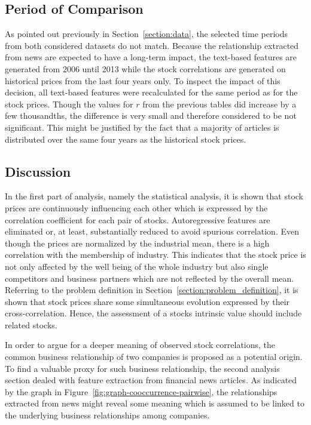 \subsection{Period of Comparison}
As pointed out previously in Section~\ref{section:data}, the selected time periods from both considered datasets do not match. Because the relationship extracted from news are expected to have a long-term impact, the text-based features are generated from 2006 until 2013 while the stock correlations are generated on historical prices from the last four years only. To inspect the impact of this decision, all text-based features were recalculated for the same period as for the stock prices. Though the values for $r$ from the previous tables did increase by a few thousandths, the difference is very small and therefore considered to be not significant. This might be justified by the fact that a majority of articles is distributed over the same four years as the historical stock prices.

\subsection{Discussion}

In the first part of analysis, namely the statistical analysis, it is shown that stock prices are continuously influencing each other which is expressed by the correlation coefficient for each pair of stocks. Autoregressive features are eliminated or, at least, substantially reduced to avoid spurious correlation. Even though the prices are normalized by the industrial mean, there is a high correlation with the membership of industry. This indicates that the stock price is not only affected by the well being of the whole industry but also single competitors and business partners which are not reflected by the overall mean. Referring to the problem definition in Section~\ref{section:problem_definition}, it is shown that stock prices share some simultaneous evolution expressed by their cross-correlation. Hence, the assessment of a stocks intrinsic value should include related stocks.

In order to argue for a deeper meaning of observed stock correlations, the common business relationship of two companies is proposed as a potential origin. To find a valuable proxy for such business relationship, the second analysis section dealed with feature extraction from financial news articles. As indicated by the graph in Figure~\ref{fig:graph-cooccurrence-pairwise}, the relationships extracted from news might reveal some meaning which is assumed to be linked to the underlying business relationships among companies.

